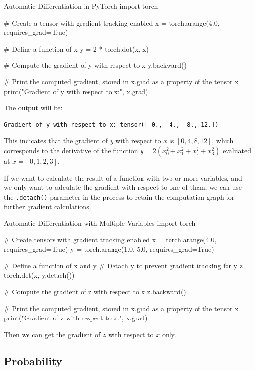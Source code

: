 \begin{pythoncode}{Automatic Differentiation in PyTorch}
import torch

# Create a tensor with gradient tracking enabled
x = torch.arange(4.0, requires_grad=True)

# Define a function of x
y = 2 * torch.dot(x, x)

# Compute the gradient of y with respect to x
y.backward()

# Print the computed gradient, stored in x.grad as a property of the tensor x
print("Gradient of y with respect to x:", x.grad)
\end{pythoncode}

The output will be:
\begin{verbatim}
Gradient of y with respect to x: tensor([ 0.,  4.,  8., 12.])
\end{verbatim}

This indicates that the gradient of \(y\) with respect to \(x\) is \([0, 4, 8, 12]\), which corresponds to the derivative of the function \(y = 2(x_0^2 + x_1^2 + x_2^2 + x_3^2)\) evaluated at \(x = [0, 1, 2, 3]\).

If we want to calculate the result of a function with two or more variables, and we only want to calculate the gradient with respect to one of them, we can use the \texttt{.detach()} parameter in the process to retain the computation graph for further gradient calculations.

\begin{pythoncode}{Automatic Differentiation with Multiple Variables}
import torch

# Create tensors with gradient tracking enabled
x = torch.arange(4.0, requires_grad=True)
y = torch.arange(1.0, 5.0, requires_grad=True)

# Define a function of x and y
# Detach y to prevent gradient tracking for y
z = torch.dot(x, y.detach())  

# Compute the gradient of z with respect to x
z.backward()

# Print the computed gradient, stored in x.grad as a property of the tensor x
print("Gradient of z with respect to x:", x.grad)
\end{pythoncode}

Then we can get the gradient of \(z\) with respect to \(x\) only.

\subsection{Probability}

